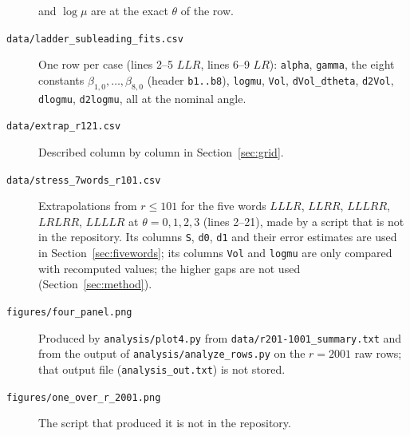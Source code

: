 \documentclass[11pt]{amsart}
\theoremstyle{definition}
\theoremstyle{remark}
\begin{document}
\begin{description}
and $\log\mu$ are at the exact $\theta$ of the row.
\item[\texttt{data/ladder\_subleading\_fits.csv}] One row per case (lines 2--5 $LLR$,
lines 6--9 $LR$): \texttt{alpha}, \texttt{gamma}, the eight constants
$\beta_{1,0}, \dots, \beta_{8,0}$ (header \texttt{b1..b8}), \texttt{logmu},
\texttt{Vol}, \texttt{dVol\_dtheta}, \texttt{d2Vol}, \texttt{dlogmu},
\texttt{d2logmu}, all at the nominal angle.
\item[\texttt{data/extrap\_r121.csv}] Described column by column in
Section~\ref{sec:grid}.
\item[\texttt{data/stress\_7words\_r101.csv}] Extrapolations from $r \le 101$ for the
five words $LLLR$, $LLRR$, $LLLRR$, $LRLRR$, $LLLLR$ at $\theta = 0, 1, 2, 3$ (lines
2--21), made by a script that is not in the repository. Its columns \texttt{S},
\texttt{d0}, \texttt{d1} and their error estimates are used in
Section~\ref{sec:fivewords}; its columns \texttt{Vol} and \texttt{logmu} are only
compared with recomputed values; the higher gaps are not used
(Section~\ref{sec:method}).
\item[\texttt{figures/four\_panel.png}] Produced by \texttt{analysis/plot4.py} from
\texttt{data/r201-1001\_summary.txt} and from the output of
\texttt{analysis/analyze\_rows.py} on the $r = 2001$ raw rows; that output file
(\texttt{analysis\_out.txt}) is not stored.
\item[\texttt{figures/one\_over\_r\_2001.png}] The script that produced it is not in
the repository.
\end{description}
\end{document}
